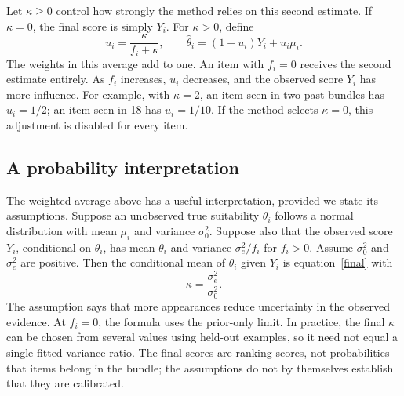\documentclass[11pt,a4paper]{article}
\numberwithin{equation}{section}
\begin{document}
Let $\kappa\ge0$ control how strongly the method relies on this second estimate. If
$\kappa=0$, the final score is simply $Y_i$. For $\kappa>0$, define
\begin{equation}\label{final}
 u_i=\frac{\kappa}{f_i+\kappa},\qquad
 \widehat\theta_i=(1-u_i)Y_i+u_i\mu_i.
\end{equation}
The weights in this average add to one. An item with $f_i=0$ receives the second estimate
entirely. As $f_i$ increases, $u_i$ decreases, and the observed score $Y_i$ has more
influence. For example, with $\kappa=2$, an item seen in two past bundles has $u_i=1/2$;
an item seen in 18 has $u_i=1/10$. If the method selects $\kappa=0$, this adjustment is
disabled for every item.

\subsection{A probability interpretation}
The weighted average above has a useful interpretation, provided we state its assumptions.
Suppose an unobserved true suitability $\theta_i$ follows a normal distribution with mean
$\mu_i$ and variance $\sigma_0^2$. Suppose also that the observed score $Y_i$, conditional
on $\theta_i$, has mean $\theta_i$ and variance $\sigma_e^2/f_i$ for $f_i>0$. Assume
$\sigma_0^2$ and $\sigma_e^2$ are positive. Then the conditional mean of $\theta_i$ given
$Y_i$ is equation~\eqref{final} with
\begin{equation}
 \kappa=\frac{\sigma_e^2}{\sigma_0^2}.
\end{equation}
The assumption says that more appearances reduce uncertainty in the observed evidence.
At $f_i=0$, the formula uses the prior-only limit. In practice, the final $\kappa$ can be
chosen from several values using held-out examples, so it need not equal a single fitted
variance ratio. The final scores are ranking scores, not probabilities that items belong
in the bundle; the assumptions do not by themselves establish that they are calibrated.
\end{document}
